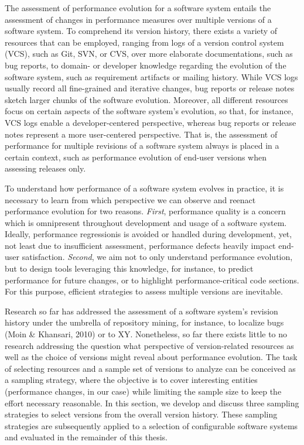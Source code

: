 
The assessment of performance evolution for a software system entails the
assessment of changes in performance measures over multiple versions of a
software system. To comprehend its version history, there exists a variety of
resources that can be employed, ranging from logs of a version control system
(VCS), such as Git, SVN, or CVS, over more elaborate documentations, such as
bug reports, to domain- or developer knowledge regarding the evolution of the
software system, such as requirement artifacts or mailing history. While VCS
logs usually record all fine-grained and iterative changes, bug reports or
release notes sketch larger chunks of the software evolution. Moreover, all
different resources focus on certain aspects of the software system’s
evolution, so that, for instance, VCS logs enable a developer-centered
perspective, whereas bug reports or release notes represent a more
user-centered perspective. That is, the assessment of performance for multiple
revisions of a software system always is placed in a certain context, such as
performance evolution of end-user versions when assessing releases only.

To understand how performance of a software system evolves in practice, it is
necessary to learn from which perspective we can observe and reenact
performance evolution for two reasons. \emph{First}, performance quality is a
concern which is omnipresent throughout development and usage of a software system.
Ideally, performance regressionis is avoided or handled during development, yet,
not least due to insufficient assessment, performance defects heavily
impact end-user satisfaction. \emph{Second}, we aim not to only understand
performance evolution, but to design tools leveraging this knowledge, for instance, to
predict performance for future changes, or to highlight performance-critical
code sections. For this purpose, efficient strategies to assess multiple
versions are inevitable.

Research so far has addressed the assessment of a software system’s revision
history under the umbrella of repository mining, for instance, to localize bugs
(Moin \& Khansari, 2010) or to XY. Nonetheless, so far there exists little to no
research addressing the question what perspective of version-related resources
as well as the choice of versions might reveal about performance evolution. The
task of selecting resources and a sample set of versions to analyze can be
conceived as a sampling strategy, where the objective is to cover interesting
entities (performance changes, in our case) while limiting the sample size to
keep the effort necessary reasonable. In this section, we develop and discuss
three sampling strategies to select versions from the overall version history.
These sampling strategies are subsequently applied to a selection of
configurable software systems and evaluated in the remainder of this thesis.


